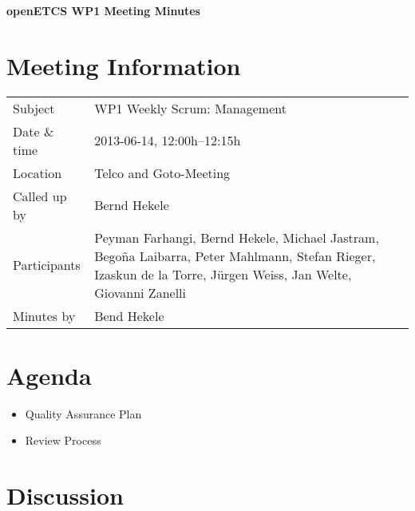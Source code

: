 \documentclass[a4paper, 11pt]{article}
\begin{document}
{\begin{center}\huge\bf openETCS WP1 Meeting Minutes\end{center}}
\section{Meeting Information}

\renewcommand{\arraystretch}{1.5}
\begin{supertabular}{m{.2\textwidth}m{.8\textwidth}}
Subject & WP1 Weekly Scrum: Management\\
Date \& time & 2013-06-14, 12:00h--12:15h\\
Location & Telco and Goto-Meeting\\
Called up by & Bernd Hekele\\
Participants &
Peyman Farhangi,
Bernd Hekele,
Michael Jastram,
Bego\~na Laibarra,
Peter Mahlmann,
Stefan Rieger,
Izaskun de la Torre,
J\"urgen Weiss,
Jan Welte,
Giovanni Zanelli\\

Minutes by & Bend Hekele\\

\end{supertabular}
\renewcommand{\arraystretch}{1.0}


\section{Agenda}
\begin{itemize}
\item Quality Assurance Plan
\item Review Process
\end{itemize}

\section{Discussion}
\end{document}
